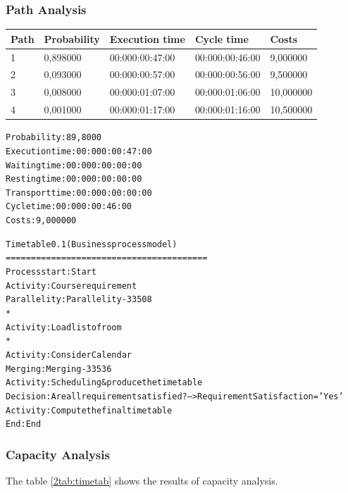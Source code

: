 \subsubsection{Path Analysis}


\begin{table}[ht!]
\centering
\begin{tabular}{|l|l|l|l|l|}
\hline
Path&Probability&Execution time&Cycle time&Costs\\
\hline
1&0,898000&00:000:00:47:00&00:000:00:46:00&9,000000\\
\hline
2&0,093000&00:000:00:57:00&00:000:00:56:00&9,500000\\
\hline
3&0,008000&00:000:01:07:00&00:000:01:06:00&10,000000\\
\hline
4&0,001000&00:000:01:17:00&00:000:01:16:00&10,500000\\
\hline
\end{tabular}
\end{table}

\begin{alltt}
Probability:   89,8000%
Execution time:  00:000:00:47:00
Waiting time:  00:000:00:00:00
Resting time:  00:000:00:00:00
Transport time:  00:000:00:00:00
Cycle time:  00:000:00:46:00
Costs:  9,000000

Timetable 0.1 (Business process model)
========================================
Process start: Start
Activity: Course requirement
Parallelity: Parallelity-33508
    *
    Activity: Load list of room
    *
    Activity: Consider Calendar
Merging: Merging-33536
Activity: Scheduling & produce the timetable
Decision: Are all requirement satisfied? --> RequirementSatisfaction='Yes'
Activity: Compute the final timetable
End: End
\end{alltt}

\subsubsection{Capacity Analysis}
The table \ref{2tab:timetab} shows the results of capacity analysis.

